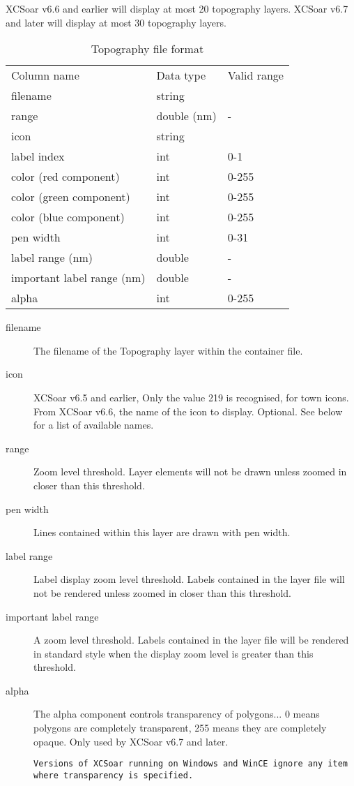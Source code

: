 XCSoar v6.6 and earlier will display at most 20 topography layers.
XCSoar v6.7 and later will display at most 30 topography layers.
\begin{table}[ht]
\centering
\sffamily
\begin{tabular}{@{}lll@{}}
\toprule
\addlinespace
Column name&Data type&Valid range\\
\cmidrule(r){1-1}\cmidrule(lr){2-2}\cmidrule(l){3-3}
filename&string&\\
range&double (nm)&-\\
icon&string&\\
label index&int&0-1\\
color (red component)&int&0-255\\
color (green component)&int&0-255\\
color (blue component)&int&0-255\\
pen width&int&0-31\\
label range (nm)&double&-\\
important label range (nm)&double&-\\
alpha&int&0-255\\
\bottomrule
\end{tabular}
\caption{Topography file format}
\label{tab:topography-file-format}
\end{table}

\begin{description}
\item[filename] The filename of the Topography layer within the container file.
\item[icon] XCSoar v6.5 and earlier, Only the value 219 is recognised, for town icons.
From XCSoar v6.6, the name of the icon to display. Optional. See below for a list of available names.
\item[range] Zoom level threshold. Layer elements will not be drawn unless zoomed in closer than this threshold.
\item[pen width] Lines contained within this layer are drawn with pen width.
\item[label range] Label display zoom level threshold. Labels contained in the layer file
will not be rendered unless zoomed in closer than this threshold.
\item[important label range] A zoom level threshold. Labels contained in the layer file will be
rendered in standard style when the display zoom level is greater than this threshold.
\item[alpha] The alpha component controls transparency of polygons...
0 means polygons are completely transparent, 255 means they are completely opaque.
Only used by XCSoar v6.7 and later.

\texttt{Versions of XCSoar running on Windows and WinCE ignore any item where transparency is specified.}

\end{description}
